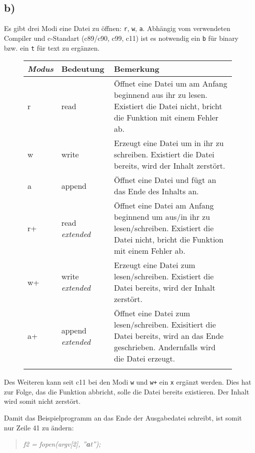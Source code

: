 \documentclass[11pt, a4paper]{scrartcl}
\begin{document}
\subsection*{b)}
Es gibt drei Modi eine Datei zu öffnen: \texttt{r}, \texttt{w}, \texttt{a}. Abhängig vom verwendeten Compiler und c-Standart (c89/c90, c99, c11) ist es notwendig ein \texttt{b} für binary bzw. ein \texttt{t} für text zu ergänzen. 
\begin{figure}[H]
\center
\begin{tabular}{lp{1.9cm}p{10cm}}
\toprule
\textit{Modus} & Bedeutung & Bemerkung \\%
\midrule 
r & read & Öffnet eine Datei um am Anfang beginnend aus ihr zu lesen. Existiert die Datei nicht, bricht die Funktion mit einem Fehler ab. \\ \addlinespace
w & write & Erzeugt eine Datei um in ihr zu schreiben. Existiert die Datei be\-reits, wird der Inhalt zerstört.\\ \addlinespace
a & append & Öffnet eine Datei und fügt an das Ende des Inhalts an.\\ \addlinespace
r+ & read \textit{\mbox{extended}} & Öffnet eine Datei am Anfang beginnend um aus/in ihr zu lesen/schreiben. Existiert die Datei nicht, bricht die Funktion mit einem Fehler ab. \\ \addlinespace
w+ & write \textit{\mbox{extended}} & Erzeugt eine Datei zum lesen/schreiben. Existiert die Datei be\-reits, wird der Inhalt zerstört. \\ \addlinespace
a+ & append \textit{\mbox{extended} }& Öffnet eine Datei zum lesen/schreiben. Exisitiert die Datei bereits, wird an das Ende geschrieben. Andernfalls wird die Datei erzeugt.\\ 
\bottomrule \addlinespace
\end{tabular}
\end{figure}
Des Weiteren kann seit c11  bei den Modi \texttt{w} und \texttt{w+} ein \texttt{x} ergänzt werden. Dies hat zur Folge, das die Funktion abbricht, solle die Datei bereits existieren. Der Inhalt wird somit nicht zerstört.

Damit das Beispielprogramm an das Ende der Ausgabedatei schreibt, ist somit nur Zeile 41 zu ändern:
\begin{quote}
\textit{f2 = fopen(argv[2], ''\textbf{a}t'');}
\end{quote}
\end{document}
